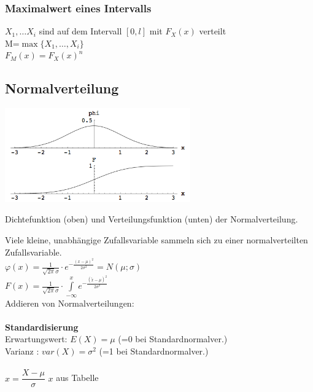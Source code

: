         \subsubsection{Maximalwert eines Intervalls }
		$X_1,\ldots X_i$ sind auf dem Intervall $[0,l]$ mit $F_X(x)$ verteilt\\
		M=$\max \{ X_1,\ldots,X_i\} $ \\
		$F_M(x)=F_X(x)^n$ \\

\newpage

	\subsection{Normalverteilung  }
		\begin{floatingfigure}[r]{8cm}
		\includegraphics[width=8cm]{./bilder/normalverteilung.png}
		\caption{Dichtefunktion (oben) und Verteilungsfunktion (unten) der
		Normalverteilung.}
   		\end{floatingfigure}
		Viele kleine, unabhängige Zufallsvariable sammeln sich zu einer
		normalverteilten Zufallsvariable.\\
		 $\varphi(x)=\frac{1}{\sqrt{2
		\pi}\sigma}\cdot e^{-\frac{(x-\mu)^2}{2\sigma^2}} = N(\mu ; \sigma) $\\ 
		$F(x)=\frac{1}{\sqrt{2
		\pi}\sigma}\cdot \int\limits^{x}_{-\infty}{e^{-\frac{(\tilde{x} -\mu)^2}{2\sigma^2}}} $ \\
		Addieren von Normalverteilungen: \\
		 \\
		\textbf{Standardisierung}\\ Erwartungswert: $E(X)=\mu$ \hspace{4mm}(=0 bei Standardnormalver.)\\ 
		Varianz \hspace{11.5mm}: $var(X)=\sigma^2$ (=1 bei Standardnormalver.)\\ \\
		$x=\dfrac{X-\mu}{\sigma}$ \hspace{5mm} $x$ aus Tabelle
 
